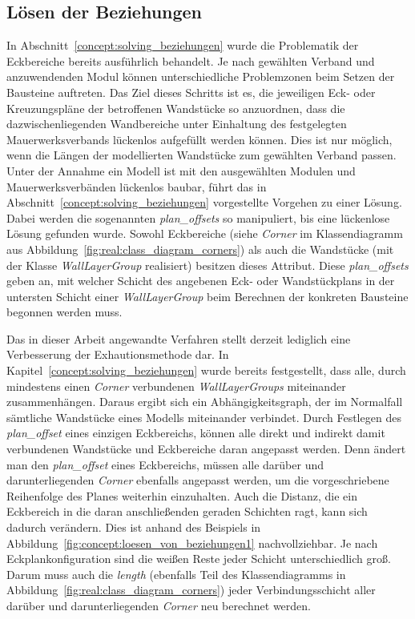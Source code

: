 \subsection*{Lösen der Beziehungen}
In Abschnitt~\ref{concept:solving_beziehungen} wurde die Problematik der Eckbereiche bereits ausführlich behandelt.
Je nach gewählten Verband und anzuwendenden Modul können unterschiedliche Problemzonen beim Setzen der Bausteine auftreten.
Das Ziel dieses Schritts ist es, die jeweiligen Eck- oder Kreuzungspläne der betroffenen Wandstücke so anzuordnen, dass die dazwischenliegenden Wandbereiche unter Einhaltung des festgelegten Mauerwerksverbands lückenlos aufgefüllt werden können.
Dies ist nur möglich, wenn die Längen der modellierten Wandstücke zum gewählten Verband passen.
Unter der Annahme ein Modell ist mit den ausgewählten Modulen und Mauerwerksverbänden lückenlos baubar, führt das in Abschnitt~\ref{concept:solving_beziehungen} vorgestellte Vorgehen zu einer Lösung. 
Dabei werden die sogenannten \textit{plan\_offsets} so manipuliert, bis eine lückenlose Lösung gefunden wurde.
Sowohl Eckbereiche (siehe \textit{Corner} im Klassendiagramm aus Abbildung~\ref{fig:real:class_diagram_corners}) als auch die Wandstücke (mit der Klasse \textit{WallLayerGroup} realisiert) besitzen dieses Attribut.
Diese \textit{plan\_offsets} geben an, mit welcher Schicht des angebenen Eck- oder Wandstückplans in der untersten Schicht einer \textit{WallLayerGroup} beim Berechnen der konkreten Bausteine begonnen werden muss.

Das in dieser Arbeit angewandte Verfahren stellt derzeit lediglich eine Verbesserung der Exhautionsmethode dar.
In Kapitel~\ref{concept:solving_beziehungen} wurde bereits festgestellt, dass alle, durch mindestens einen \textit{Corner} verbundenen \textit{WallLayerGroups} miteinander zusammenhängen.
Daraus ergibt sich ein Abhängigkeitsgraph, der im Normalfall sämtliche Wandstücke eines Modells miteinander verbindet.
Durch Festlegen des \textit{plan\_offset} eines einzigen Eckbereichs, können alle direkt und indirekt damit verbundenen Wandstücke und Eckbereiche daran angepasst werden.
Denn ändert man den \textit{plan\_offset} eines Eckbereichs, müssen alle darüber und darunterliegenden \textit{Corner} ebenfalls angepasst werden, um die vorgeschriebene Reihenfolge des Planes weiterhin einzuhalten.
Auch die Distanz, die ein Eckbereich in die daran anschließenden geraden Schichten ragt, kann sich dadurch verändern.
Dies ist anhand des Beispiels in Abbildung~\ref{fig:concept:loesen_von_beziehungen1} nachvollziehbar.
Je nach Eckplankonfiguration sind die weißen Reste jeder Schicht unterschiedlich groß.
Darum muss auch die \textit{length} (ebenfalls Teil des Klassendiagramms in Abbildung~\ref{fig:real:class_diagram_corners}) jeder Verbindungsschicht aller darüber und darunterliegenden \textit{Corner} neu berechnet werden.


